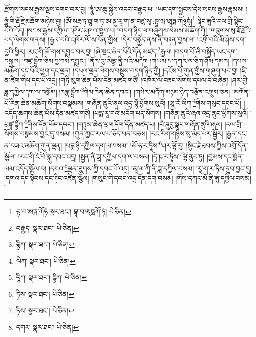 རྫོགས་སངས་རྒྱས་ལྔས་དགང་བར་བྱ། །ཧཱུཾ་ཨ་ཆུ་སྐྱེས་འདབ་བརྒྱད་པ། །ཡང་དག་སྦྱངས་དེས་སངས་རྒྱས་རྣམས། །ཧཱུཾ་གི་རྡོ་རྗེ་མཆོག་མཉེས་བྱ། །ཨོཾ་སརྦ་ཏ་ཐཱ་ག་ཏ་ཨ་ནུ་རཱ་ག་ན་བཛྲ་སྭ་:བྷཱ་ཝ་ཨཱཏྨ་ཀོ྅ཧཾ།\footnote{བྷ་བ་ཨཏྨ་ཀོཧཾ  སྣར་ཐང་། བྷཱ་བ་ཨཱཏྨཀོ་ཧཾ།  པེ་ཅིན། } སྙིང་ཟླའི་རལ་གྲི་སྙིང་པོའི་འོད། །སངས་རྒྱས་དཀྱིལ་འཁོར་མཁའ་ཁྱབ་པ། །བདག་ཉིད་ལ་བཞུགས་སེམས་མཆོག་གི། །གཟུགས་སུ་རྡོ་རྗེའི་པད་ལེགས་གནས། །རྒྱལ་བའི་འཁོར་ལོ་ས་བོན་གྱིས། །དེར་བསྐྱེད་ནས་ནི་བརྟན་བྱས་ལ། །འགྲོ་བའི་མི་ཤེས་དག་བྱའི་ཕྱིར། །རང་གི་ཆོ་གས་དབྱུང་བར་བྱ། །ཞེ་སྡང་ཆེན་པོའི་དོན་མཛད་\footnote{བརྒྱད་  སྣར་ཐང་།  པེ་ཅིན། }རྒྱལ། །བདག་པོ་མི་བསྐྱོད་ཡང་དག་བསྐུལ། །བཛྲ་དྷྲྀཀ་ཅེས་བྱ་བས་དབྱུང་། །ནོར་བུ་ཨིནྡྲ་ནཱི་ལའི་མདོག །གཡས་པ་དཀར་ལ་ཅིག་ཤོས་དམར། །དཔལ་མཆོག་དང་པོའི་ཕྱག་དང་ལྡན། །དཔལ་ལྡན་ལེགས་བསྡུས་བདག་ཉིད་ཀྱི། །དངོས་པོ་ཀུན་གྱིས་གཞུག་པར་བྱ། །ཛི་ན་ཛིག་གིས་དང་པོ་འདྲ། །གཏི་མུག་ཆེན་པོས་དོན་མཛད་གཙོ། །འཁོར་ལོ་བཟང་སོགས་དཔལ་དེ་བཞིན། །ཤར་གྱི་ཟླ་དཀྱིལ་དག་ལ་བསྒོམ། །རཏྣ་དྷྲྀཀ་\footnote{དྷྲིཀ་  སྣར་ཐང་།  པེ་ཅིན། }གིས་རིན་ཆེན་དབང་། །གསེར་མདོག་མཉམ་ཉིད་བརྩོན་འགྲུས་ཅན། །མགོན་པོ་རིན་ཆེན་མཆོག་སོགས་བསྣམས། །གཞོན་ནུའི་ཞལ་འདྲ་ལྷོ་ཕྱོགས་སུའོ། །ཨཱ་རོ་ལྀཀ་\footnote{ལིཀ་  སྣར་ཐང་།  པེ་ཅིན། }གིས་གསུང་དབང་པོ། །འདོད་ཆགས་ཆེན་པོས་དོན་མཛད་གཙོ། །པདྨ་རཱ་གའི་མདོག་པད་སོགས། །གཞོན་ནུའི་ཞལ་འདྲ་ནུབ་ཕྱོགས་སུའོ། །པྲཛྙཱ་དྷྲྀཀ་\footnote{དཱིཀ་  སྣར་ཐང་། དྷྲིཀ་  པེ་ཅིན། }གིས་དོན་ཡོད་དབང་། །གཏུམ་ཆེན་ཕྲག་དོག་དོན་མཛད་པ། །བཻ་ཌཱུརྱ་སྣང་གཞོན་ནུའི་ཞལ། །རལ་གྲི་སོགས་བསྣམས་བྱང་དུ་བསམ། །ཀུན་ཀྱང་རལ་པ་ཅོད་པན་བཅས། །རང་རིག་གཉིས་སུ་མེད་པར་སྦྱོར། །རྒྱན་དང་ན་བཟའ་མཆོག་ཀུན་ལྡན། །པདྨ་ཉི་དཀྱིལ་དག་ལ་བསམ། །མོ་ཧ་ར་ཏཱིས་\footnote{ཏིས་  སྣར་ཐང་།  པེ་ཅིན། }ཤར་ལྷོ་རུ། །སྙིང་རྗེ་ཐབས་ཀྱིས་འགྲོ་དོན་སྩོལ། །རང་གི་ངོ་བོ་སྐུ་དབང་འདྲ། །སྤྱན་ནི་ཟླ་དཀྱིལ་དག་ལ་བསམ། །དྭེ་ཥ་ར་ཏཱིས་\footnote{ཏིས་  སྣར་ཐང་།  པེ་ཅིན། }ལྷོ་ནུབ་ཏུ། །བྱམས་དང་སྨོན་ལམ་འདོད་སྩོལ་བ། །དགའ་\footnote{དགར་  སྣར་ཐང་།  པེ་ཅིན། }ལྡན་ཐུགས་ཀྱི་དབང་པོ་འདྲ། །མཱ་མ་ཀཱི་ནི་ཟླ་དཀྱིལ་བསམ། །རཱ་ག་ར་ཏིས་ནུབ་བྱང་དུ། །དགའ་དང་སྟོབས་དང་ཏིང་འཛིན་སྩོལ། །གསུང་གི་དབང་འདྲ་དོན་དག་བསམ། །གོས་དཀར་མོ་ནི་ཟླ་དཀྱིལ་བསམ། །
